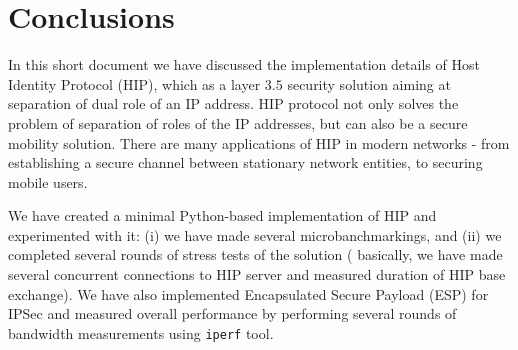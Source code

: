 \section{Conclusions}
\label{section:conclusion}

In this short document we have discussed the implementation 
details of Host Identity Protocol (HIP), which as a layer $3.5$ 
security solution aiming at separation of dual role of an IP
address. HIP protocol not only solves the problem of separation
of roles of the IP addresses, but can also be a secure mobility
solution. There are many applications of HIP in modern networks -
from establishing a secure channel between stationary network
entities, to securing mobile users.

We have created a minimal Python-based implementation of HIP and 
experimented with it: (i) we have made several microbanchmarkings, and (ii)
we completed several rounds of stress tests of the solution (
basically, we have made several concurrent connections to HIP
server and measured duration of HIP base exchange). We have also 
implemented Encapsulated Secure Payload (ESP) for IPSec and 
measured overall performance by performing several rounds of 
bandwidth measurements using \texttt{iperf} tool.